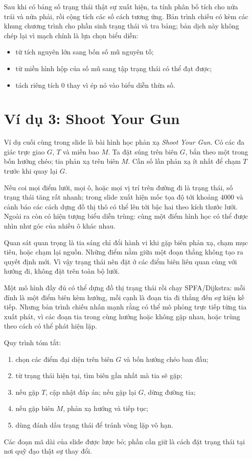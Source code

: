 \documentclass[11pt]{article}
\begin{document}
Sau khi có bảng số trạng thái thật sự xuất hiện, ta tính phân bố tích cho nửa
trái và nửa phải, rồi cộng tích các số cách tương ứng. Bản trình chiếu có kèm
các khung chương trình cho phần sinh trạng thái và tra bảng; bản dịch này
không chép lại vì mạch chính là lựa chọn biểu diễn:
\begin{itemize}
  \item từ tích nguyên lớn sang bốn số mũ nguyên tố;
  \item từ miền hình hộp của số mũ sang tập trạng thái có thể đạt được;
  \item tách riêng tích \(0\) thay vì ép nó vào biểu diễn thừa số.
\end{itemize}

\section{Ví dụ 3: Shoot Your Gun}

Ví dụ cuối cùng trong slide là bài hình học phản xạ \textit{Shoot Your Gun}.
Có các đa giác trực giao \(G\), \(T\) và miền bao \(M\). Ta đặt súng trên biên
\(G\), bắn theo một trong bốn hướng chéo; tia phản xạ trên biên \(M\). Cần số
lần phản xạ ít nhất để chạm \(T\) trước khi quay lại \(G\).

Nếu coi mọi điểm lưới, mọi ô, hoặc mọi vị trí trên đường đi là trạng thái, số
trạng thái tăng rất nhanh; trong slide xuất hiện mốc tọa độ tới khoảng
\(4000\) và cảnh báo các cách dựng đồ thị thô có thể lên tới bậc hai theo
kích thước lưới. Ngoài ra còn có hiện tượng biểu diễn trùng: cùng một điểm
hình học có thể được nhìn như góc của nhiều ô khác nhau.

Quan sát quan trọng là tia sáng chỉ đổi hành vi khi gặp biên phản xạ, chạm
mục tiêu, hoặc chạm lại nguồn. Những điểm nằm giữa một đoạn thẳng không tạo ra
quyết định mới. Vì vậy trạng thái nên đặt ở các điểm biên liên quan cùng với
hướng đi, không đặt trên toàn bộ lưới.

Một mô hình đầy đủ có thể dựng đồ thị trạng thái rồi chạy SPFA/Dijkstra: mỗi
đỉnh là một điểm biên kèm hướng, mỗi cạnh là đoạn tia đi thẳng đến sự kiện kế
tiếp. Nhưng bản trình chiếu nhấn mạnh rằng có thể mô phỏng trực tiếp từng tia
xuất phát, vì các đoạn tia trong cùng hướng hoặc không gặp nhau, hoặc trùng
theo cách có thể phát hiện lặp.

Quy trình tóm tắt:
\begin{enumerate}
  \item chọn các điểm đại diện trên biên \(G\) và bốn hướng chéo ban đầu;
  \item từ trạng thái hiện tại, tìm biên gần nhất mà tia sẽ gặp;
  \item nếu gặp \(T\), cập nhật đáp án; nếu gặp lại \(G\), dừng đường tia;
  \item nếu gặp biên \(M\), phản xạ hướng và tiếp tục;
  \item dùng đánh dấu trạng thái để tránh vòng lặp vô hạn.
\end{enumerate}
Các đoạn mã dài của slide được lược bỏ; phần cần giữ là cách đặt trạng thái
tại nơi quỹ đạo thật sự thay đổi.
\end{document}
